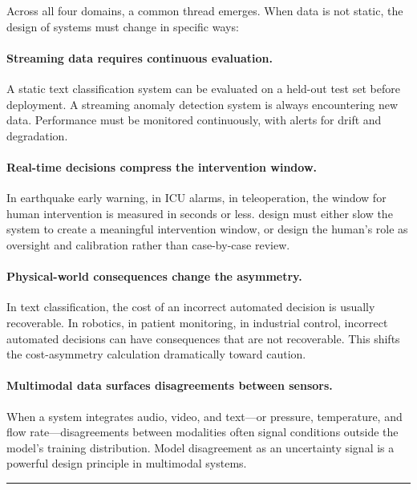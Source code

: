 Across all four domains, a common thread emerges. When data is not static, the design of \hitl systems must change in specific ways:

\paragraph{Streaming data requires continuous evaluation.} A static text classification system can be evaluated on a held-out test set before deployment. A streaming anomaly detection system is always encountering new data. Performance must be monitored continuously, with alerts for drift and degradation.

\paragraph{Real-time decisions compress the intervention window.} In earthquake early warning, in ICU alarms, in teleoperation, the window for human intervention is measured in seconds or less. \hitl design must either slow the system to create a meaningful intervention window, or design the human's role as oversight and calibration rather than case-by-case review.

\paragraph{Physical-world consequences change the asymmetry.} In text classification, the cost of an incorrect automated decision is usually recoverable. In robotics, in patient monitoring, in industrial control, incorrect automated decisions can have consequences that are not recoverable. This shifts the cost-asymmetry calculation dramatically toward caution.

\paragraph{Multimodal data surfaces disagreements between sensors.} When a system integrates audio, video, and text---or pressure, temperature, and flow rate---disagreements between modalities often signal conditions outside the model's training distribution. Model disagreement as an uncertainty signal is a powerful design principle in multimodal \hitl systems.

\bigskip
\begin{center}
\rule{0.5\textwidth}{0.4pt}
\end{center}
\bigskip

